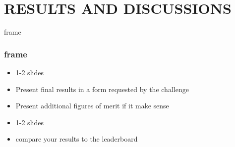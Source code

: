 \section{RESULTS AND DISCUSSIONS}
\label{results_and_discussions_section}


\begin{frame}{frame} %
    \frametitle{frame}
    \begin{itemize}
        \item 1-2 slides
        \item Present final results in a form requested by the challenge
        \item Present additional figures of merit if it make sense
        \item 1-2 slides
        \item compare your results to the leaderboard
    \end{itemize}
\end{frame}